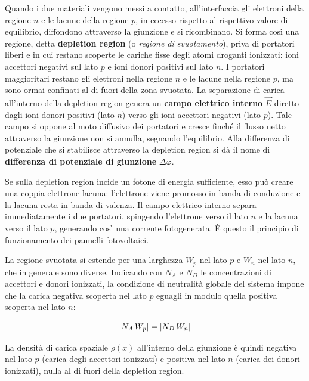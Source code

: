 Quando i due materiali vengono messi a contatto, all'interfaccia gli elettroni della regione \( n \) e le lacune della regione \( p \), in eccesso rispetto al rispettivo valore di equilibrio, diffondono attraverso la giunzione e si ricombinano. Si forma così una regione, detta \textbf{depletion region} (o \emph{regione di svuotamento}), priva di portatori liberi e in cui restano scoperte le cariche fisse degli atomi droganti ionizzati: ioni accettori negativi sul lato \( p \) e ioni donori positivi sul lato \( n \). I portatori maggioritari restano gli elettroni nella regione \( n \) e le lacune nella regione \( p \), ma sono ormai confinati al di fuori della zona svuotata.
La separazione di carica all'interno della depletion region genera un \textbf{campo elettrico interno} \( \vec{E} \) diretto dagli ioni donori positivi (lato \( n \)) verso gli ioni accettori negativi (lato \( p \)). Tale campo si oppone al moto diffusivo dei portatori e cresce finché il flusso netto attraverso la giunzione non si annulla, segnando l'equilibrio. Alla differenza di potenziale che si stabilisce attraverso la depletion region si dà il nome di \textbf{differenza di potenziale di giunzione} \( \Delta \varphi \).

Se sulla depletion region incide un fotone di energia sufficiente, esso può creare una coppia elettrone-lacuna: l'elettrone viene promosso in banda di conduzione e la lacuna resta in banda di valenza. Il campo elettrico interno separa immediatamente i due portatori, spingendo l'elettrone verso il lato \( n \) e la lacuna verso il lato \( p \), generando così una corrente fotogenerata. È questo il principio di funzionamento dei pannelli fotovoltaici.

La regione svuotata si estende per una larghezza \( W_p \) nel lato \( p \) e \( W_n \) nel lato \( n \), che in generale sono diverse. Indicando con \( N_A \) e \( N_D \) le concentrazioni di accettori e donori ionizzati, la condizione di neutralità globale del sistema impone che la carica negativa scoperta nel lato \( p \) eguagli in modulo quella positiva scoperta nel lato \( n \):
\begin{importantbox}
    \begin{equation}
        \abs{N_A \, W_p} = \abs{N_D \, W_n}
    \end{equation}
\end{importantbox}
La densità di carica spaziale \( \rho(x) \) all'interno della giunzione è quindi negativa nel lato \( p \) (carica degli accettori ionizzati) e positiva nel lato \( n \) (carica dei donori ionizzati), nulla al di fuori della depletion region.


